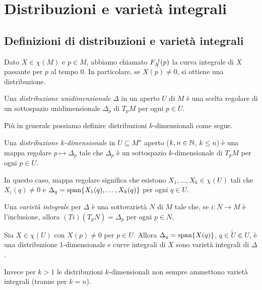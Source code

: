 \chapter{Distribuzioni e varietà integrali}


\section{Definizioni di distribuzioni e varietà integrali}

Dato $X\in\chi(M)$ e $p\in M$, abbiamo chiamato $F_{X}^{\ t}(p)$ la curva integrale di $X$ passante per $p$ al tempo $0$. In particolare, se $X(p)\neq 0$, si ottiene una distribuzione.

\begin{definition} 
	Una \emph{distribuzione unidimensionale} $\Delta$ in un aperto $U$ di $M$ è una scelta regolare di un sottospazio unidimensionale $\Delta_p$ di $T_pM$ per ogni $p\in U$.
\end{definition}

Più in generale possiamo definire distribuzioni $k$-dimensionali come segue.

\begin{definition} 
	Una \emph{distribuzione $k$-dimensionale} in $U\subseteq M^n$ aperto ($k,n\in\mathbb N$, $k\le n$) è una mappa regolare  $p\mapsto \Delta_p$ tale che $\Delta_p$ è un sottospazio $k$-dimensionale di $T_pM$ per ogni $p\in U$.
	
	In questo caso, mappa regolare significa che esistono $X_1,\ldots,X_k\in \chi(U)$ tali che $X_i(q)\ne 0$ e $\Delta_q=\mathrm{span}\{X_1(q),\ldots,X_k(q)\}$ per ogni $q\in U$.
\end{definition}

\begin{definition} 
	Una \emph{varietà integrale} per $\Delta$ è una sottovarietà $N$ di $M$ tale che, se $i:N\to M$ è l'inclusione,
	allora $(Ti)(T_pN)=\Delta_p$ per ogni $p\in N$.
\end{definition}

\begin{example}
	Sia $X\in\chi(U)$ con $X(p)\ne 0$ per $p\in U$. Allora $\Delta_q=\mathrm{span} \{X(q)\}$, $q\in\tilde U\Subset U$, è una distribuzione 1-dimensionale e curve integrali di $X$ sono varietà integrali di $\Delta$.
\end{example}

Invece per $k>1$ le distribuzioni $k$-dimensionali non sempre ammettono varietà integrali (tranne per $k=n$).

